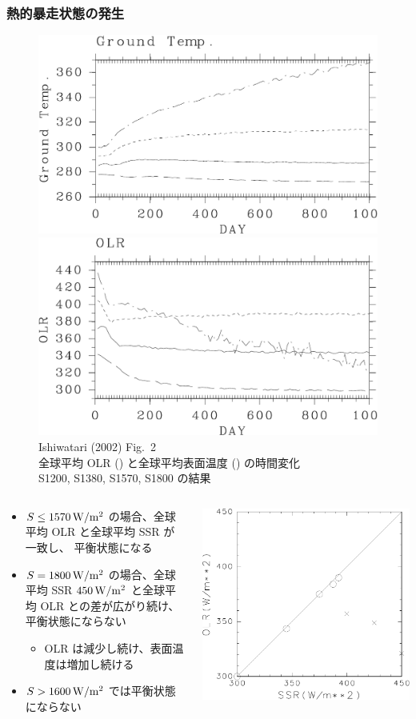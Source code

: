 \documentclass[aspectratio=149,9pt,fleqn]{beamer}
\begin{document}
\begin{frame}
	\frametitle{熱的暴走状態の発生}
	\begin{figure}
		\scriptsize
		\includegraphics[width=.45\textwidth]{./fig/Tg-seqs.kps-crop.pdf}
		\includegraphics[width=.45\textwidth]{./fig/OLR-seqs.kps-crop.pdf}\\
		Ishiwatari \etal (2002) Fig.~2\\
		全球平均 OLR () と全球平均表面温度 () の時間変化\\
		S1200, S1380, S1570, S1800 の結果
	\end{figure}
	\begin{columns}[T,onlytextwidth]
		\begin{column}{.7\textwidth}
			\begin{itemize}
				\item \(S\leq1570\hmu{W/m^2}\) の場合、全球平均 OLR と全球平均 SSR が一致し、
					平衡状態になる
				\item \(S=1800\hmu{W/m^2}\) の場合、全球平均 SSR \(450\hmu{W/m^2}\) と全球平均
					OLR との差が広がり続け、平衡状態にならない
					\begin{itemize}
						\item OLR は減少し続け、表面温度は増加し続ける
					\end{itemize}
				\item \(S>1600\hmu{W/m^2}\) では平衡状態にならない
			\end{itemize}
		\end{column}
		\begin{column}{.3\textwidth}
			\centering\scriptsize
			\includegraphics[width=.7\textwidth]{./fig/ISR-OLR.kps-crop.pdf}\\

\end{column}
\end{columns}
\end{frame}
\end{document}
